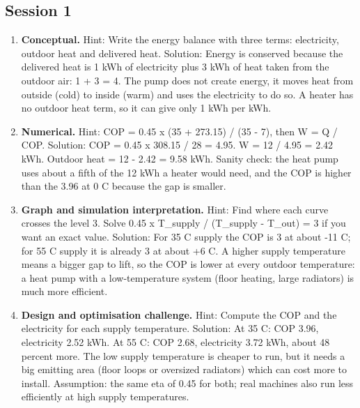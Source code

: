 \documentclass[11pt,a4paper]{article}
\begin{document}
\subsection*{Session 1}
\begin{enumerate}[nosep]
\item \textbf{Conceptual.} Hint: Write the energy balance with three terms: electricity, outdoor heat and delivered heat. Solution: Energy is conserved because the delivered heat is 1 kWh of electricity plus 3 kWh of heat taken from the outdoor air: 1 + 3 = 4. The pump does not create energy, it moves heat from outside (cold) to inside (warm) and uses the electricity to do so. A heater has no outdoor heat term, so it can give only 1 kWh per kWh.
\item \textbf{Numerical.} Hint: COP = 0.45 x (35 + 273.15) / (35 - 7), then W = Q / COP. Solution: COP = 0.45 x 308.15 / 28 = 4.95. W = 12 / 4.95 = 2.42 kWh. Outdoor heat = 12 - 2.42 = 9.58 kWh. Sanity check: the heat pump uses about a fifth of the 12 kWh a heater would need, and the COP is higher than the 3.96 at 0 C because the gap is smaller.
\item \textbf{Graph and simulation interpretation.} Hint: Find where each curve crosses the level 3. Solve 0.45 x T\_supply / (T\_supply - T\_out) = 3 if you want an exact value. Solution: For 35 C supply the COP is 3 at about -11 C; for 55 C supply it is already 3 at about +6 C. A higher supply temperature means a bigger gap to lift, so the COP is lower at every outdoor temperature: a heat pump with a low-temperature system (floor heating, large radiators) is much more efficient.
\item \textbf{Design and optimisation challenge.} Hint: Compute the COP and the electricity for each supply temperature. Solution: At 35 C: COP 3.96, electricity 2.52 kWh. At 55 C: COP 2.68, electricity 3.72 kWh, about 48 percent more. The low supply temperature is cheaper to run, but it needs a big emitting area (floor loops or oversized radiators) which can cost more to install. Assumption: the same eta of 0.45 for both; real machines also run less efficiently at high supply temperatures.
\end{enumerate}
\end{document}
